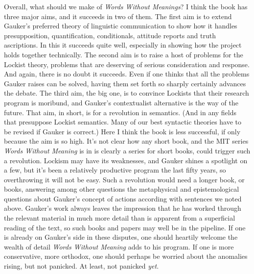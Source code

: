 \documentclass[
  11pt,
  letterpaper,
  DIV=11,
  numbers=noendperiod,
  oneside]{scrartcl}
\begin{document}
Overall, what should we make of \emph{Words Without Meanings}? I think
the book has three major aims, and it succeeds in two of them. The first
aim is to extend Gauker's preferred theory of linguistic communication
to show how it handles presupposition, quantification, conditionals,
attitude reports and truth ascriptions. In this it succeeds quite well,
especially in showing how the project holds together technically. The
second aim is to raise a host of problems for the Lockist theory,
problems that are deserving of serious consideration and response. And
again, there is no doubt it succeeds. Even if one thinks that all the
problems Gauker raises can be solved, having them set forth so sharply
certainly advances the debate. The third aim, the big one, is to
convince Lockists that their research program is moribund, and Gauker's
contextualist alternative is the way of the future. That aim, in short,
is for a revolution in semantics. (And in any fields that presuppose
Lockist semantics. Many of our best syntactic theories have to be
revised if Gauker is correct.) Here I think the book is less successful,
if only because the aim is so high. It's not clear how any short book,
and the MIT series \emph{Words Without Meaning} is in is clearly a
series for short books, could trigger such a revolution. Lockism may
have its weaknesses, and Gauker shines a spotlight on a few, but it's
been a relatively productive program the last fifty years, so
overthrowing it will not be easy. Such a revolution would need a longer
book, or books, answering among other questions the metaphysical and
epistemological questions about Gauker's concept of actions according
with sentences we noted above. Gauker's work always leaves the
impression that he has worked through the relevant material in much more
detail than is apparent from a superficial reading of the text, so such
books and papers may well be in the pipeline. If one is already on
Gauker's side in these disputes, one should heartily welcome the wealth
of detail \emph{Words Without Meaning} adds to his program. If one is
more conservative, more orthodox, one should perhaps be worried about
the anomalies rising, but not panicked. At least, not panicked
\emph{yet}.
\end{document}
